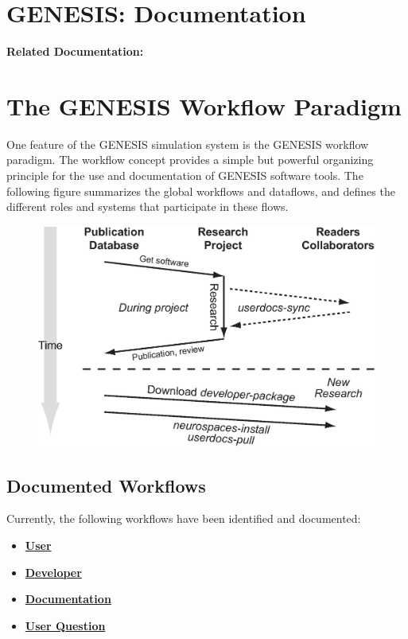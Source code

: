 \documentclass[12pt]{article}
\begin{document}
\section*{GENESIS: Documentation}

{\bf Related Documentation:}

\section*{The GENESIS Workflow Paradigm}

One feature of the GENESIS simulation system is the GENESIS workflow
paradigm. The workflow concept provides a simple but powerful
organizing principle for the use and documentation of GENESIS software
tools. The following figure summarizes the global workflows and
dataflows, and defines the different roles and systems that
participate in these flows.

\begin{figure}[h]
  \centering
   \includegraphics[scale=0.6]{figures/global-workdata-flow.eps}
  \label{fig:wf-1}
\end{figure}

\subsection*{Documented Workflows}
Currently, the following workflows have been identified and documented:
\begin{itemize}
\item \href{../workflow-user/workflow-user.tex}{\bf User}
\item \href{../workflow-developer/workflow-developer.tex}{\bf Developer}
\item \href{../workflow-documentation/workflow-documentation.tex}{\bf Documentation}
\item \href{../workflow-user-query/workflow-user-query.tex}{\bf User Question}
\end{itemize}
\end{document}
